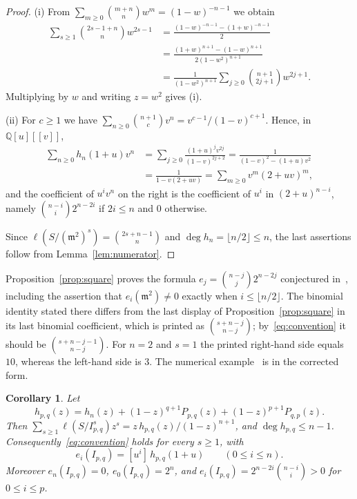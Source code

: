 \documentclass{amsart}
\newtheorem{corollary}[theorem]{Corollary}
\theoremstyle{definition}
\theoremstyle{remark}
\numberwithin{equation}{section}
\newcommand{\QQ}{\mathbb{Q}}
\newcommand{\mm}{\mathfrak{m}}
\newcommand{\cf}[1]{[#1]\,}
\newcommand{\fl}[1]{\lfloor #1\rfloor}
\begin{document}
\begin{proof}
(i) From $\sum_{m\ge0}\binom{m+n}{n}w^m=(1-w)^{-n-1}$ we obtain
\begin{align*}
  \sum_{s\ge1}\binom{2s-1+n}{n}w^{2s-1}
  &=\frac{(1-w)^{-n-1}-(1+w)^{-n-1}}{2}\\
  &=\frac{(1+w)^{n+1}-(1-w)^{n+1}}{2(1-w^2)^{n+1}}\\
  &=\frac{1}{(1-w^2)^{n+1}}\sum_{j\ge0}\binom{n+1}{2j+1}w^{2j+1}.
\end{align*}
Multiplying by $w$ and writing $z=w^2$ gives (i).

(ii) For $c\ge1$ we have $\sum_{n\ge0}\binom{n+1}{c}v^n=v^{c-1}/(1-v)^{c+1}$.
Hence, in $\QQ[u][[v]]$,
\begin{align*}
  \sum_{n\ge0}h_n(1+u)v^n&=\sum_{j\ge0}\frac{(1+u)^jv^{2j}}{(1-v)^{2j+2}}
  =\frac{1}{(1-v)^2-(1+u)v^2}\\
  &=\frac{1}{1-v(2+uv)}=\sum_{m\ge0}v^m(2+uv)^m,
\end{align*}
and the coefficient of $u^iv^n$ on the right is the coefficient of $u^i$ in
$(2+u)^{n-i}$, namely $\binom{n-i}{i}2^{n-2i}$ if $2i\le n$ and $0$ otherwise.

Since $\ell(S/(\mm^2)^s)=\binom{2s+n-1}{n}$ and $\deg h_n=\fl{n/2}\le n$, the
last assertions follow from Lemma~\ref{lem:numerator}.
\end{proof}

Proposition~\ref{prop:square} proves the formula
$e_j=\binom{n-j}{j}2^{n-2j}$ conjectured in~\cite[Conjecture~3.1]{Fr}, including
the assertion that $e_i(\mm^2)\ne0$ exactly when $i\le\fl{n/2}$. The binomial
identity stated there differs from the last display of
Proposition~\ref{prop:square} in its last binomial coefficient, which is
printed as $\binom{s+n-j}{n-j}$; by~\eqref{eq:convention} it should be
$\binom{s+n-j-1}{n-j}$. For $n=2$ and $s=1$ the printed right-hand side equals
$10$, whereas the left-hand side is $3$. The numerical
example~\cite[Example~3.1]{Fr} is in the corrected form.

\begin{corollary}\label{cor:numerator}
Let
\[
  h_{p,q}(z)=h_n(z)+(1-z)^{q+1}P_{p,q}(z)+(1-z)^{p+1}P_{q,p}(z).
\]
Then $\sum_{s\ge1}\ell(S/I_{p,q}^s)z^s=z\,h_{p,q}(z)/(1-z)^{n+1}$, and
$\deg h_{p,q}\le n-1$. Consequently~\eqref{eq:convention} holds for every
$s\ge1$, with
\[
  e_i(I_{p,q})=\cf{u^i}h_{p,q}(1+u)\qquad(0\le i\le n).
\]
Moreover $e_n(I_{p,q})=0$, $e_0(I_{p,q})=2^n$, and
$e_i(I_{p,q})=2^{n-2i}\binom{n-i}{i}>0$ for $0\le i\le p$.
\end{corollary}
\end{document}
